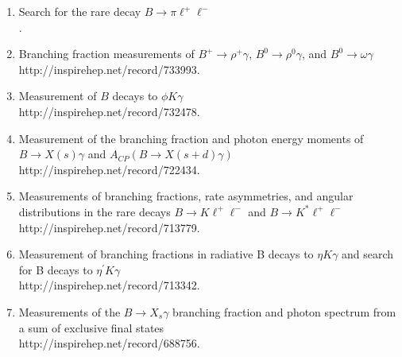 \documentclass [12pt]{report}
\begin{document}
\begin{enumerate}

\item Search for the rare decay $B\rightarrow \pi\ell^+\ell^-$\\
.

\item Branching fraction measurements of $B^+ \rightarrow \rho^+ \gamma$, $B^0 \rightarrow \rho^0 \gamma$, and $B^0 \rightarrow \omega \gamma$\\
{http://inspirehep.net/record/733993}.

\item Measurement of $B$ decays to $\phi K \gamma$\\
{http://inspirehep.net/record/732478}.

\item Measurement of the branching fraction and photon energy moments of $B \rightarrow X(s) \gamma$ and $A_{CP}(B \rightarrow X(s+d) \gamma)$\\
{http://inspirehep.net/record/722434}.

\item Measurements of branching fractions, rate asymmetries, and angular distributions in the rare decays $B\rightarrow K\ell^+\ell^-$ and $B\rightarrow K^{*}\ell^+\ell^-$\\
{http://inspirehep.net/record/713779}.

\item Measurement of branching fractions in radiative B decays to $\eta K \gamma$ and search for B decays to $\eta^{\prime} K \gamma$\\
{http://inspirehep.net/record/713342}.

\item Measurements of the $B \rightarrow X_s\gamma$ branching fraction and photon spectrum from a sum of exclusive final states\\
{http://inspirehep.net/record/688756}.


\end{enumerate}
\end{document}
